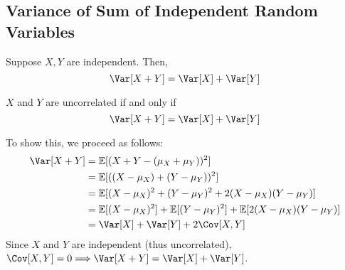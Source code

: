 \subsection{Variance of Sum of Independent Random Variables}
\begin{theorem}
    Suppose \(X, Y\) are independent. Then, 
    \[
        \Var[X + Y] = \Var[X] + \Var[Y]
    \]

    \begin{remark}
        \(X\) and \(Y\) are uncorrelated if and only if 
        \[
            \Var[X + Y] = \Var[X] + \Var[Y]
        \]
    \end{remark}
\end{theorem}

To show this, we proceed as follows: 
\[
    \begin{aligned}
        \Var[X + Y] &= \mathbb{E}[(X + Y - (\mu_X + \mu_Y))^2] \\
        &= \mathbb{E}[((X - \mu_X) + (Y - \mu_Y))^2] \\
        &= \mathbb{E}[(X - \mu_X)^2 + (Y - \mu_Y)^2 + 2(X - \mu_X)(Y - \mu_Y)] \\
        &= \mathbb{E}[(X - \mu_X)^2] + \mathbb{E}[(Y - \mu_Y)^2] + \mathbb{E}[2(X - \mu_X)(Y - \mu_Y)] \\
        &= \Var[X] + \Var[Y] + 2\Cov[X, Y] \\
    \end{aligned}
\]
Since \(X\) and \(Y\) are independent (thus uncorrelated), \(\Cov[X, Y] = 0 \Longrightarrow \Var[X + Y] = \Var[X] + \Var[Y]\). 

